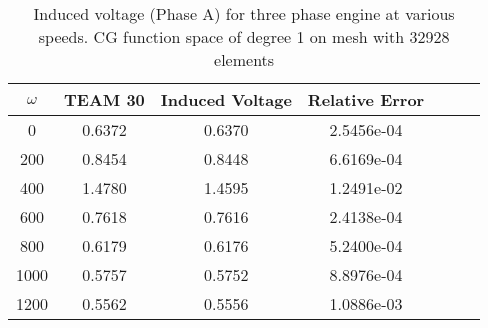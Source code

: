 \begin{table}[!ht]
\centering
\caption{Induced voltage (Phase A) for three phase engine at various speeds. CG function space of degree 1 on mesh with 32928 elements}
\label{tab:voltage:three}
\begin{tabular}{ccccccc}
\toprule
$\omega$ & TEAM 30 & Induced Voltage & Relative Error \\
\midrule
       0 &  0.6372 &          0.6370 &     2.5456e-04 \\
     200 &  0.8454 &          0.8448 &     6.6169e-04 \\
     400 &  1.4780 &          1.4595 &     1.2491e-02 \\
     600 &  0.7618 &          0.7616 &     2.4138e-04 \\
     800 &  0.6179 &          0.6176 &     5.2400e-04 \\
    1000 &  0.5757 &          0.5752 &     8.8976e-04 \\
    1200 &  0.5562 &          0.5556 &     1.0886e-03 \\
\bottomrule
\end{tabular}
\end{table}
